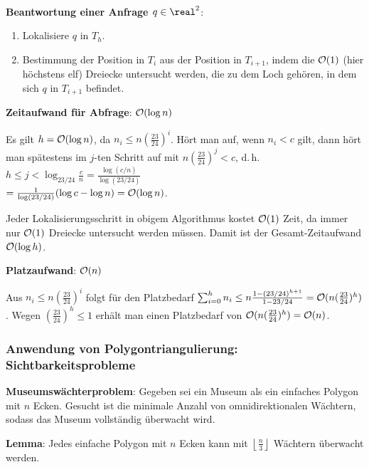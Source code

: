 \linie\
\pagebreak


\textbf{Beantwortung einer Anfrage $q \in \real^2$}:
\begin{enumerate}
    \item
    Lokalisiere $q$ in $T_h$.

    \item
    Bestimmung der Position in $T_i$ aus der Position in $T_{i+1}$, indem die $\mathcal{O}(1)$
    (hier höchstens elf) Dreiecke untersucht werden, die zu dem Loch gehören, in dem sich
    $q$ in $T_{i+1}$ befindet.
\end{enumerate}

\textbf{Zeitaufwand für Abfrage}:
$\mathcal{O}(\log n)$

\begin{Beweis}
    Es gilt $h = \mathcal{O}(\log n)$, da $n_i \le n (\frac{23}{24})^i$.
    Hört man auf, wenn $n_i < c$ gilt, dann hört man spätestens im $j$-ten Schritt auf mit
    $n (\frac{23}{24})^j < c$, d.\,h.
    $h \le j < \log_{23/24} \frac{c}{n}
    = \frac{\log(c/n)}{\log(23/24)}$\\
    $= \frac{1}{\log(23/24)} (\log c - \log n) = \mathcal{O}(\log n)$.

    Jeder Lokalisierungsschritt in obigem Algorithmus kostet $\mathcal{O}(1)$ Zeit,
    da immer nur $\mathcal{O}(1)$ Dreiecke untersucht werden müssen.
    Damit ist der Gesamt-Zeitaufwand $\mathcal{O}(\log h)$.
\end{Beweis}

\textbf{Platzaufwand}:
$\mathcal{O}(n)$

\begin{Beweis}
    Aus $n_i \le n (\frac{23}{24})^i$ folgt für den Platzbedarf
    $\sum_{i=0}^{h} n_i
    \le n \frac{1 - (23/24)^{h+1}}{1 - 23/24}
    = \mathcal{O}(n (\frac{23}{24})^h)$.
    Wegen $(\frac{23}{24})^h \le 1$
    erhält man einen Platzbedarf von $\mathcal{O}(n (\frac{23}{24})^h) = \mathcal{O}(n)$.
\end{Beweis}

\subsubsection{%
    Anwendung von Polygontriangulierung: Sichtbarkeitsprobleme%
}

\textbf{Museumswächterproblem}:
Gegeben sei ein Museum als ein einfaches Polygon mit $n$ Ecken.
Gesucht ist die minimale Anzahl von omnidirektionalen Wächtern, sodass das Museum vollständig
überwacht wird.

\textbf{Lemma}:
Jedes einfache Polygon mit $n$ Ecken kann mit
$\left\lfloor \frac{n}{3} \right\rfloor$ Wächtern überwacht werden.

